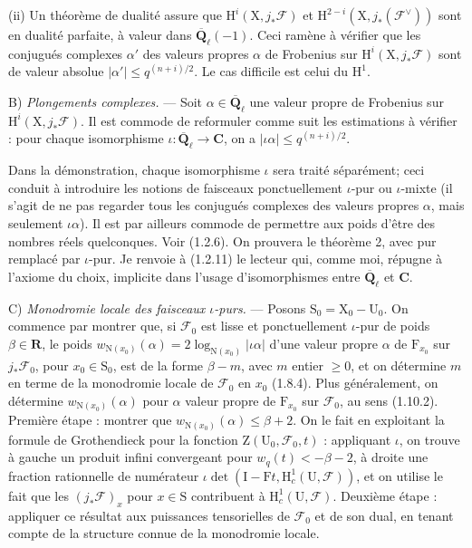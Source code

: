 \documentclass[11pt,leqno]{article}
\begin{document}
(ii) Un théorème de dualité assure que \(\mathrm{H}^i(\mathrm{X},j_*\mathscr{F})\) et \(\mathrm{H}^{2-i}(\mathrm{X},j_*(\mathscr{F}^{\vee}))\) sont en dualité parfaite, à valeur dans \(\overline{\mathbf{Q}}_\ell(-1)\). Ceci ramène à vérifier que les conjugués complexes \(\alpha'\) des valeurs propres \(\alpha\) de Frobenius sur \(\mathrm{H}^i(\mathrm{X},j_*\mathscr{F})\) sont de valeur absolue \(|\alpha'|\leq q^{(n+i)/2}\). Le cas difficile est celui du \(\mathrm{H}^1\).

B) \textit{Plongements complexes.} — Soit \(\alpha\in\overline{\mathbf{Q}}_\ell\) une valeur propre de Frobenius sur \(\mathrm{H}^i(\mathrm{X},j_*\mathscr{F})\). Il est commode de reformuler comme suit les estimations à vérifier : pour chaque isomorphisme \(\iota:\overline{\mathbf{Q}}_\ell\to\mathbf{C}\), on a \(|\iota\alpha|\leq q^{(n+i)/2}\).

Dans la démonstration, chaque isomorphisme \(\iota\) sera traité séparément; ceci conduit à introduire les notions de faisceaux ponctuellement \(\iota\)-pur ou \(\iota\)-mixte (il s’agit de ne pas regarder tous les conjugués complexes des valeurs propres \(\alpha\), mais seulement \(\iota\alpha\)). Il est par ailleurs commode de permettre aux poids d’être des nombres réels quelconques. Voir (1.2.6). On prouvera le théorème 2, avec pur remplacé par \(\iota\)-pur. Je renvoie à (1.2.11) le lecteur qui, comme moi, répugne à l’axiome du choix, implicite dans l’usage d’isomorphismes entre \(\overline{\mathbf{Q}}_\ell\) et \(\mathbf{C}\).

C) \textit{Monodromie locale des faisceaux \(\iota\)-purs.} — Posons \(\mathrm{S}_0=\mathrm{X}_0-\mathrm{U}_0\). On commence par montrer que, si \(\mathscr{F}_0\) est lisse et ponctuellement \(\iota\)-pur de poids \(\beta\in\mathbf{R}\), le poids \(w_{\mathrm{N}(x_0)}(\alpha)=2\log_{\mathrm{N}(x_0)}|\iota\alpha|\) d’une valeur propre \(\alpha\) de \(\mathrm{F}_{x_0}\) sur \(j_*\mathscr{F}_0\), pour \(x_0\in\mathrm{S}_0\), est de la forme \(\beta-m\), avec \(m\) entier \(\geq 0\), et on détermine \(m\) en terme de la monodromie locale de \(\mathscr{F}_0\) en \(x_0\) (1.8.4). Plus généralement, on détermine \(w_{\mathrm{N}(x_0)}(\alpha)\) pour \(\alpha\) valeur propre de \(\mathrm{F}_{x_0}\) sur \(\mathscr{F}_0\), au sens (1.10.2). Première étape : montrer que \(w_{\mathrm{N}(x_0)}(\alpha)\leq\beta+2\). On le fait en exploitant la formule de Grothendieck pour la fonction \(\mathrm{Z}(\mathrm{U}_0,\mathscr{F}_0,t)\) : appliquant \(\iota\), on trouve à gauche un produit infini convergeant pour \(w_q(t)<-\beta-2\), à droite une fraction rationnelle de numérateur \(\iota\det(\mathrm{I}-\mathrm{F}t,\mathrm{H}_c^1(\mathrm{U},\mathscr{F}))\), et on utilise le fait que les \((j_*\mathscr{F})_x\) pour \(x\in\mathrm{S}\) contribuent à \(\mathrm{H}_c^1(\mathrm{U},\mathscr{F})\). Deuxième étape : appliquer ce résultat aux puissances tensorielles de \(\mathscr{F}_0\) et de son dual, en tenant compte de la structure connue de la monodromie locale.
\end{document}
